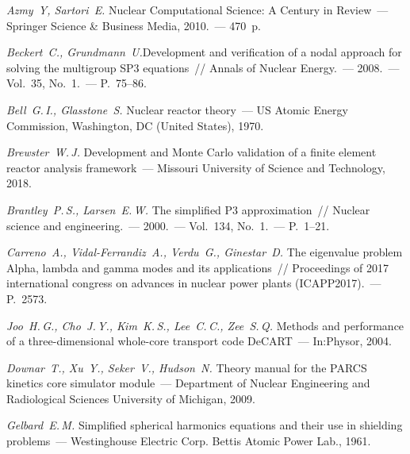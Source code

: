 \documentclass{crm-article}
\begin{document}
\begin{thebibliography}
 {\it Azmy~Y, Sartori~E.} Nuclear Computational Science: A Century in Review~--- Springer Science \& Business Media, 2010.~--- 470~p.

 {\it Beckert~C., Grundmann~U.}Development and verification of a nodal approach for solving the multigroup SP3 equations~// Annals of Nuclear Energy.~--- 2008.~--- Vol.~35, No.~1.~--- P.~75--86.

 {\it Bell~G.\,I., Glasstone~S.} Nuclear reactor theory~--- US Atomic Energy Commission, Washington, DC (United States), 1970.

 {\it Brewster~W.\,J.} Development and Monte Carlo validation of a finite element reactor analysis framework~--- Missouri University of Science and Technology, 2018.

 {\it Brantley~P.\,S., Larsen~E.\,W.} The simplified P3 approximation~// Nuclear science and engineering.~--- 2000.~--- Vol.~134, No.~1.~--- P.~1--21.

 {\it Carreno~A., Vidal-Ferrandiz~A., Verdu~G., Ginestar~D.} The eigenvalue problem Alpha, lambda and gamma modes and its applications~// Proceedings of 2017 international congress on advances in nuclear power plants (ICAPP2017).~--- P.~2573.

 {\it Joo~H.\,G., Cho~J.\,Y., Kim~K.\,S., Lee~C.\,C., Zee~S.\,Q.} Methods and performance of a three-dimensional whole-core transport code DeCART~--- In:Physor, 2004.

 {\it Downar~T., Xu~Y., Seker~V., Hudson~N.} Theory manual for the PARCS kinetics core simulator module~--- Department of Nuclear Engineering and Radiological Sciences University of Michigan, 2009.


 {\it Gelbard~E.\,M.} Simplified spherical harmonics equations and their use in shielding problems~--- Westinghouse Electric Corp. Bettis Atomic Power Lab., 1961.



\end{thebibliography}
\end{document}
